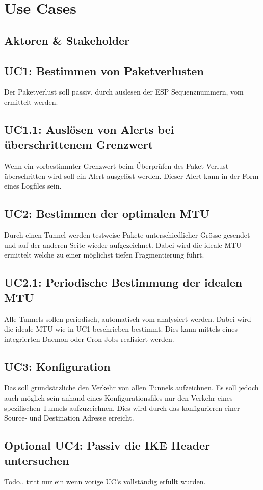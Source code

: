 \section{Use Cases}
\label{sec:Use Cases}


\subsection{Aktoren \& Stakeholder}


\subsection{UC1: Bestimmen von Paketverlusten}
Der Paketverlust soll passiv, durch auslesen der ESP Sequenznummern, vom \tool ermittelt werden.

\subsection{UC1.1: Auslösen von Alerts bei überschrittenem Grenzwert}
Wenn ein vorbestimmter Grenzwert beim Überprüfen des Paket-Verlust  überschritten wird soll ein Alert ausgelöst werden. Dieser Alert kann in der Form eines Logfiles sein.

\subsection{UC2: Bestimmen der optimalen MTU}
Durch einen Tunnel werden testweise Pakete unterschiedlicher Grösse gesendet und auf der anderen Seite wieder aufgezeichnet. Dabei wird die ideale MTU ermittelt welche zu einer möglichst tiefen Fragmentierung führt.

\subsection{UC2.1: Periodische Bestimmung der idealen MTU}
Alle Tunnels sollen periodisch, automatisch vom \tool analysiert werden. Dabei wird die ideale MTU wie in UC1 beschrieben bestimmt. Dies kann mittels eines integrierten Daemon oder Cron-Jobs realisiert werden.

\subsection{UC3: Konfiguration}
Das \tool soll grundsätzliche den Verkehr von allen Tunnels aufzeichnen. Es soll jedoch auch möglich sein anhand eines Konfigurationsfiles nur den Verkehr eines spezifischen Tunnels aufzuzeichnen. Dies wird durch das konfigurieren einer Source- und Destination Adresse erreicht.

\subsection{Optional UC4: Passiv die IKE Header untersuchen}
Todo.. tritt nur ein wenn vorige UC's vollständig erfüllt wurden.
